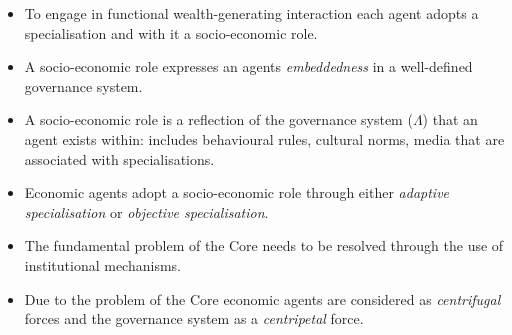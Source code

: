 \documentclass[10pt]{beamer}
\begin{document}
\begin{frame} %
\begin{itemize}
\item To engage in functional wealth-generating interaction each agent adopts a specialisation and with it a socio-economic role.
\medskip
\item A socio-economic role expresses an agents \emph{embeddedness} in a well-defined governance system.
\medskip
\begin{figure}[h]
\begin{center}
\end{center}
\end{figure}
\medskip
\item A socio-economic role is a reflection of the governance system ($\Lambda$) that an agent exists within: includes behavioural rules, cultural norms, media that are associated with specialisations.
\medskip
\item Economic agents adopt a socio-economic role through either \emph{adaptive specialisation} or \emph{objective specialisation}.
\end{itemize}
\end{frame}


\begin{frame} %
\begin{itemize}
\item The fundamental problem of the Core needs to be resolved through the use of institutional mechanisms.
\end{itemize}
\medskip
\begin{figure}[h]
\begin{center}
\end{center}
\end{figure}
\begin{itemize}
\medskip
\item Due to the problem of the Core economic agents are considered as \emph{centrifugal} forces and the governance system as a \emph{centripetal} force.
\end{itemize}
\end{frame}
\end{document}
